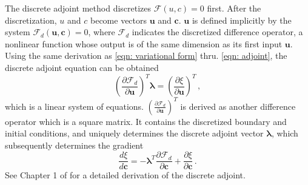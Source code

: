 The discrete adjoint method \cite{discrete adjoint}
discretizes $\mathcal{F}(u,c)=0$ first. After the discretization, $u$ and $c$ become
vectors $\boldsymbol{u}$ and $\boldsymbol{c}$.
$\boldsymbol{u}$ is defined implicitly by the system
$\mathcal{F}_d(\boldsymbol{u}, \boldsymbol{c}) = 0$, where $\mathcal{F}_d$ indicates
the discretized difference operator, a nonlinear function whose output is of the same dimension as its
first input $\boldsymbol{u}$. Using the same derivation as \eqref{eqn: variational form}
thru. \eqref{eqn: adjoint}, the discrete adjoint equation can be obtained
\begin{equation}
    \left(\frac{\partial \mathcal{F}_d}{\partial \boldsymbol{u}}\right)^T \boldsymbol{\lambda} = \left(\frac{\partial \xi}{\partial \boldsymbol{u}}\right)^T\,,
    \label{eqn: adjoint discrete}
\end{equation}
which is a linear system of equations.
$\left(\frac{\partial \mathcal{F}_d}{\partial \boldsymbol{u}}\right)^T$ is derived as
another difference operator which is a square matrix. It contains the
discretized boundary and initial conditions, and uniquely
determines the discrete adjoint vector $\boldsymbol{\lambda}$, which subsequently determines the
gradient
\begin{equation}
    \frac{d\xi}{d\boldsymbol{c}} = - \boldsymbol{\lambda}^T \frac{\partial \mathcal{F}_d}{\partial \boldsymbol{c}} + \frac{\partial \xi}{\partial \boldsymbol{c}}
\,.
    \label{eqn: dxidc adjoint discrete}
\end{equation}
See Chapter 1 of \cite{discrete adjoint phd} for a detailed derivation of the discrete adjoint.\\

